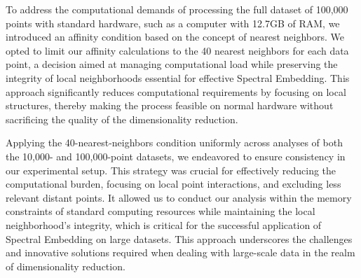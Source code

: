 \begin{itemize}
\begin{itemize}
            To address the computational demands of processing the full dataset of 100,000 points with standard hardware, such as a computer with 12.7GB of RAM, we introduced an affinity condition based on the concept of nearest neighbors. We opted to limit our affinity calculations to the 40 nearest neighbors for each data point, a decision aimed at managing computational load while preserving the integrity of local neighborhoods essential for effective Spectral Embedding. This approach significantly reduces computational requirements by focusing on local structures, thereby making the process feasible on normal hardware without sacrificing the quality of the dimensionality reduction.

            Applying the 40-nearest-neighbors condition uniformly across analyses of both the 10,000- and 100,000-point datasets, we endeavored to ensure consistency in our experimental setup. This strategy was crucial for effectively reducing the computational burden, focusing on local point interactions, and excluding less relevant distant points. It allowed us to conduct our analysis within the memory constraints of standard computing resources while maintaining the local neighborhood's integrity, which is critical for the successful application of Spectral Embedding on large datasets. This approach underscores the challenges and innovative solutions required when dealing with large-scale data in the realm of dimensionality reduction.
            

\end{itemize}
\end{itemize}
